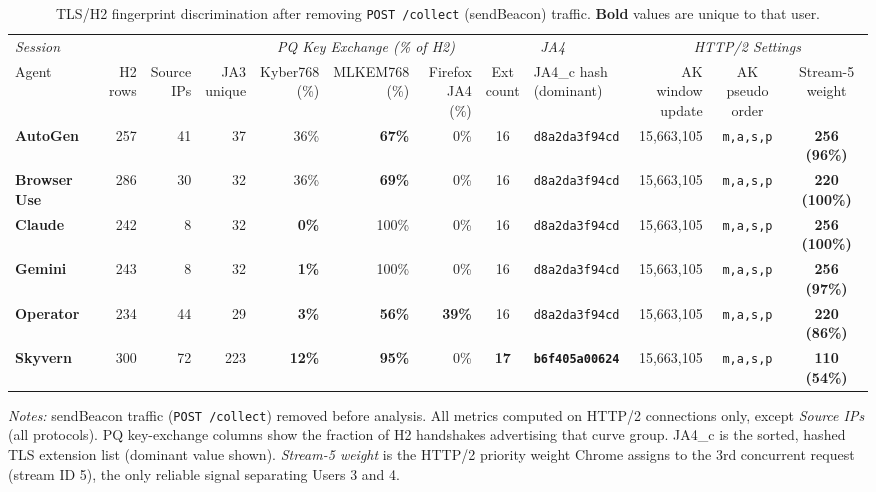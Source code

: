\begin{table}[ht]
\centering
\caption{TLS/H2 fingerprint discrimination after removing \texttt{POST /collect} (sendBeacon) traffic. \textbf{Bold} values are unique to that user.}
\label{tab:tls_fingerprints}

\begin{tabular}{@{}lrrrrrrclrcc@{}}
\toprule
\multicolumn{4}{l}{\textit{Session}} & \multicolumn{3}{c}{\textit{PQ Key Exchange (\% of H2)}} & \multicolumn{2}{c}{\textit{JA4}} & \multicolumn{3}{c}{\textit{HTTP/2 Settings}} \\
\cmidrule(lr){1-4} \cmidrule(lr){5-7} \cmidrule(lr){8-9} \cmidrule(lr){10-12}
Agent & \makecell[r]{H2\\rows} & \makecell[r]{Source\\IPs} & \makecell[r]{JA3\\unique} & \makecell[r]{Kyber768\\(\%)} & \makecell[r]{MLKEM768\\(\%)} & \makecell[r]{Firefox\\JA4 (\%)} & \makecell[c]{Ext\\count} & \makecell[l]{JA4\_c hash\\(dominant)} & \makecell[r]{AK window\\update} & \makecell[c]{AK pseudo\\order} & \makecell[c]{Stream-5\\weight} \\
\midrule
\textbf{AutoGen} & 257 & 41 & 37 & 36\% & \textbf{67\%} & 0\% & 16 & \texttt{d8a2da3f94cd} & 15,663,105 & \texttt{m,a,s,p} & \textbf{256 (96\%)} \\
\textbf{Browser Use} & 286 & 30 & 32 & 36\% & \textbf{69\%} & 0\% & 16 & \texttt{d8a2da3f94cd} & 15,663,105 & \texttt{m,a,s,p} & \textbf{220 (100\%)} \\
\textbf{Claude} & 242 & 8 & 32 & \textbf{0\%} & 100\% & 0\% & 16 & \texttt{d8a2da3f94cd} & 15,663,105 & \texttt{m,a,s,p} & \textbf{256 (100\%)} \\
\textbf{Gemini} & 243 & 8 & 32 & \textbf{1\%} & 100\% & 0\% & 16 & \texttt{d8a2da3f94cd} & 15,663,105 & \texttt{m,a,s,p} & \textbf{256 (97\%)} \\
\textbf{Operator} & 234 & 44 & 29 & \textbf{3\%} & \textbf{56\%} & \textbf{39\%} & 16 & \texttt{d8a2da3f94cd} & 15,663,105 & \texttt{m,a,s,p} & \textbf{220 (86\%)} \\
\textbf{Skyvern} & 300 & 72 & 223 & \textbf{12\%} & \textbf{95\%} & 0\% & \textbf{17} & \textbf{\texttt{b6f405a00624}} & 15,663,105 & \texttt{m,a,s,p} & \textbf{110 (54\%)} \\
\bottomrule
\end{tabular}

\medskip
\noindent\small
\textit{Notes:} sendBeacon traffic (\texttt{POST /collect}) removed before analysis. All metrics computed on HTTP/2 connections only, except \textit{Source IPs} (all protocols). PQ key-exchange columns show the fraction of H2 handshakes advertising that curve group. JA4\_c is the sorted, hashed TLS extension list (dominant value shown). \textit{Stream-5 weight} is the HTTP/2 priority weight Chrome assigns to the 3rd concurrent request (stream ID 5), the only reliable signal separating Users 3 and 4.
\end{table}